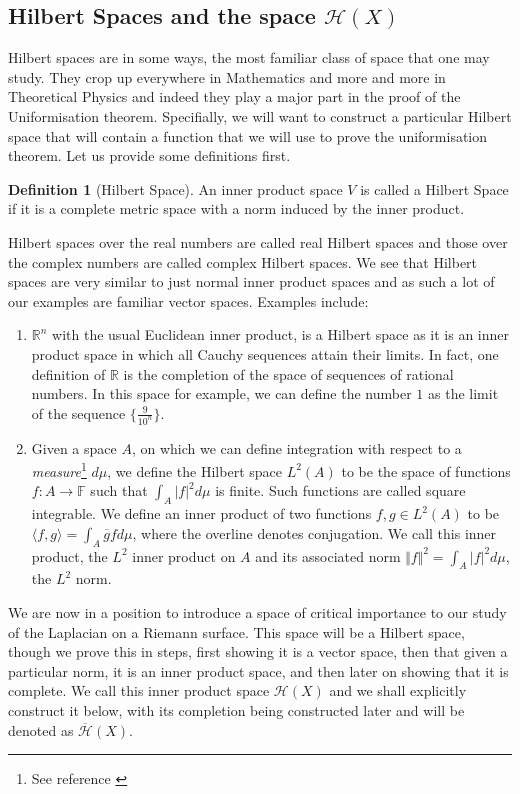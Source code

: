 \documentclass[11pt]{report}
\theoremstyle{definition}
\newtheorem{defn}[thm]{Definition}
\begin{document}
\subsection{Hilbert Spaces and the space $\mathcal{H}(X)$}

Hilbert spaces are in some ways, the most familiar class of space that one may study. They crop up everywhere in Mathematics and more and more in Theoretical Physics and indeed they play a major part in the proof of the Uniformisation theorem. Specifially, we will want to construct a particular Hilbert space that will contain a function that we will use to prove the uniformisation theorem. Let us provide some definitions first.

\begin{defn}[Hilbert Space]
  An inner product space $V$ is called a Hilbert Space if it is a complete metric space with a norm induced by the inner product.
\end{defn}
Hilbert spaces over the real numbers are called real Hilbert spaces and those over the complex numbers are called complex Hilbert spaces. We see that Hilbert spaces are very similar to just normal inner product spaces and as such a lot of our examples are familiar vector spaces. Examples include:
\begin{enumerate}
  \item $\mathbb{R}^n$ with the usual Euclidean inner product, is a Hilbert space as it is an inner product space in which all Cauchy sequences attain their limits. In fact, one definition of $\mathbb{R}$ is the completion of the space of sequences of rational numbers. In this space for example, we can define the number $1$ as the limit of the sequence $\{\frac{9}{10^n}\}$.
  \item Given a space $A$, on which we can define integration with respect to a \emph{measure}\footnote{See reference \cite[(Chapter 11)]{babyRudin}} $d\mu$, we define the Hilbert space $L^2(A)$ to be the space of functions $f: A \rightarrow \mathbb{F}$ such that $\int_A |f|^2 d\mu$ is finite. Such functions are called square integrable. We define an inner product of two functions $f,g \in L^2(A)$ to be $\langle f, g\rangle = \int_A \overline{g} f d\mu$, where the overline denotes conjugation. We call this inner product, the $L^2$ inner product on $A$ and its associated norm $\Vert f \Vert ^2 = \int_A |f|^2 d\mu$, the $L^2$ norm.
\end{enumerate}

We are now in a position to introduce a space of critical importance to our study of the Laplacian on a Riemann surface. This space will be a Hilbert space, though we prove this in steps, first showing it is a vector space, then that given a particular norm, it is an inner product space, and then later on showing that it is complete. We call this inner product space $\mathcal{H}(X)$ and we shall explicitly construct it below, with its completion being constructed later and will be denoted as $\overline{\mathcal{H}}(X)$. 
\end{document}
